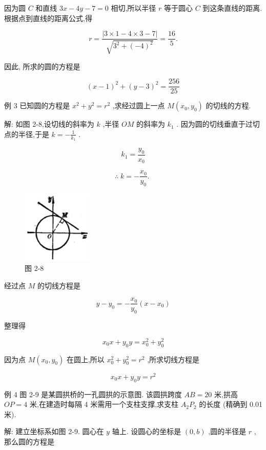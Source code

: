 \documentclass[lang=cn,newtx,10pt,scheme=chinese]{elegantbook}
\begin{document}
因为圆 \(C\) 和直线 \({3x} - {4y} - 7 = 0\) 相切,所以半径 \(r\) 等于圆心 \(C\) 到这条直线的距离. 根据点到直线的距离公式,得

\[
  r = \frac{\left| 3 \times 1 - 4 \times 3 - 7\right| }{\sqrt{{3}^{2} + {\left( -4\right) }^{2}}} = \frac{16}{5}.
\]

因此, 所求的圆的方程是

\[
    {\left( x - 1\right) }^{2} + {\left( y - 3\right) }^{2} = \frac{256}{25}
\]

例 3 已知圆的方程是 \({x}^{2} + {y}^{2} = {r}^{2}\) ,求经过圆上一点 \(M\left( {{x}_{0},{y}_{0}}\right)\) 的切线的方程.

解: 如图 2-8,设切线的斜率为 \(k\) ,半径 \({OM}\) 的斜率为 \({k}_{1}\) . 因为圆的切线垂直于过切点的半径,于是 \(k = - \frac{1}{{k}_{1}}\) .

\[
    {k}_{1} = \frac{{y}_{0}}{{x}_{0}}
\]

\[
  \therefore \;k = - \frac{{x}_{0}}{{y}_{0}}\text{. }
\]

\begin{figure}[h]
  \centering
  \includegraphics[max width=0.3\textwidth]{images/01912cc2-ffb6-728e-9ae7-b113ff05c64b_79_916236.jpg}
  \caption{图 2-8}
\end{figure}



经过点 \(M\) 的切线方程是

\[
  y - {y}_{0} = - \frac{{x}_{0}}{{y}_{0}}\left( {x - {x}_{0}}\right)
\]

整理得

\[
    {x}_{0}x + {y}_{0}y = {x}_{0}^{2} + {y}_{0}^{2}
\]

因为点 \(M\left( {{x}_{0},{y}_{0}}\right)\) 在圆上,所以 \({x}_{0}^{2} + {y}_{0}^{2} = {r}^{2}\) ,所求切线方程是

\[
    {x}_{0}x + {y}_{0}y = {r}^{2}
\]

例 4 图 2-9 是某圆拱桥的一孔圆拱的示意图. 该圆拱跨度 \({AB} = {20}\) 米,拱高 \({OP} = 4\) 米,在建造时每隔 4 米需用一个支柱支撑,求支柱 \({A}_{2}{P}_{2}\) 的长度 (精确到 0.01 米).

解: 建立坐标系如图 2-9. 圆心在 \(y\) 轴上. 设圆心的坐标是 \(\left( {0,b}\right)\) ,圆的半径是 \(r\) ,那么圆的方程是
\end{document}
